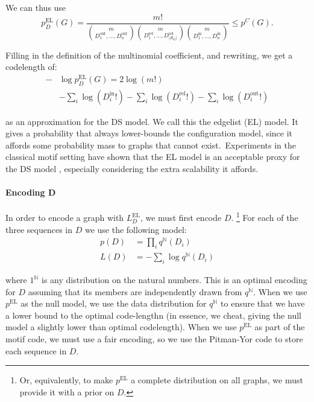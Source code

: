 \documentclass[letterpaper]{article} %
\newcommand{\N}{{\mathbb N}}
\begin{document}
We can thus use 
\[
p^\text{EL}_D(G) =  \frac{m!}{{m \choose {D_1^\text{out}, \ldots, D_n^\text{out}} }
 {m \choose {D_1^\text{rel}, \ldots, D_{|R_G|}^\text{rel}} }
 {m \choose {D_1^\text{in}, \ldots, D_n^\text{in}} }} \leq p^C(G) \text{.}
\]

Filling in the definition of the multinomial coefficient, and rewriting, we get a codelength of:
\begin{align*}
- &\log p^\text{EL}_D(G) = 2 \log(m!) \\
&- \sum_i \log(D_i^\text{in}!)- \sum_i \log(D_i^\text{rel}!)- \sum_i \log(D_i^\text{out}!)
\end{align*}

as an approximation for the DS model. We call this the edgelist (EL) model. It gives a probability that always lower-bounds the configuration model, since it affords some probability mass to graphs that cannot exist.\footnotemark ~Experiments in the classical motif setting have shown that the EL model is an acceptable proxy for the DS model \cite{bloem2017large}, especially considering the extra scalability it affords.

 
 \paragraph{Encoding D} In order to encode a graph with $L^\text{EL}_D$, we must first encode $D$. \footnote{Or, equivalently, to make $p^\text{EL}$ a complete distribution on all graphs, we must provide it with a prior on $D$.} For each of the three sequences in $D$ we use the following model:
\begin{align*}
 p(D) &= \prod_i q^{\N}(D_i) \\
 L(D) &= - \sum_i \log q^{\N}(D_i)
\end{align*}

where $1^{\N}$ is any distribution on the natural numbers. This is an optimal encoding for $D$ assuming that its members are independently drawn from $q^{\N}$. When we use $p^\text{EL}$ as the null model, we use the data distribution for $q^{\N}$ to ensure that we have a lower bound to the optimal code-lengthn (in essence, we cheat, giving the null model a slightly lower than optimal codelength). When we use $p^\text{EL}$ as part of the motif code, we must use a fair encoding, so we use the Pitman-Yor code to store each sequence in $D$.
\end{document}
